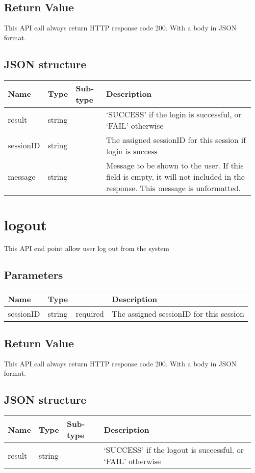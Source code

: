 \documentclass[a4paper,12pt]{report}
\begin{document}
	\subsection{Return Value}
	This API call always return HTTP response code 200. With a body in JSON format.
	\subsection{JSON structure}
	\begin{tabular}{|l|l|l|p{10cm}|}
		\hline
		Name & Type & Sub-type & Description\\\hline
		result & string & & 	`SUCCESS' if the login is successful, or\newline
									`FAIL' otherwise\\\hline
		sessionID & string & & The assigned sessionID for this session if login is success\\\hline
		message & string & & Message to be shown to the user. If this field is empty, it will not included in the response. This message is unformatted.\\\hline
	\end{tabular}
	\section{logout}
	This API end point allow user log out from the system
	\subsection{Parameters}
	\begin{tabular}{|l|ll|p{10cm}|}
		\hline
		Name & Type & & Description\\\hline
		sessionID & string & required & The assigned sessionID for this session\\\hline
	\end{tabular}
	\subsection{Return Value}
	This API call always return HTTP response code 200. With a body in JSON format.
	\subsection{JSON structure}
	\begin{tabular}{|l|l|l|p{10cm}|}
		\hline
		Name & Type & Sub-type & Description\\\hline
		result & string &  & 	`SUCCESS' if the logout is successful, or\newline
		`FAIL' otherwise\\\hline
	\end{tabular}
\end{document}
